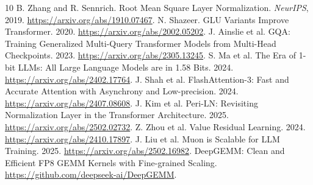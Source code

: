 \documentclass[11pt]{article}
\begin{document}
\begin{thebibliography}{10}
 B. Zhang and R. Sennrich. Root Mean Square Layer Normalization. \emph{NeurIPS}, 2019. \url{https://arxiv.org/abs/1910.07467}.
 N. Shazeer. GLU Variants Improve Transformer. 2020. \url{https://arxiv.org/abs/2002.05202}.
 J. Ainslie et al. GQA: Training Generalized Multi-Query Transformer Models from Multi-Head Checkpoints. 2023. \url{https://arxiv.org/abs/2305.13245}.
 S. Ma et al. The Era of 1-bit LLMs: All Large Language Models are in 1.58 Bits. 2024. \url{https://arxiv.org/abs/2402.17764}.
 J. Shah et al. FlashAttention-3: Fast and Accurate Attention with Asynchrony and Low-precision. 2024. \url{https://arxiv.org/abs/2407.08608}.
 J. Kim et al. Peri-LN: Revisiting Normalization Layer in the Transformer Architecture. 2025. \url{https://arxiv.org/abs/2502.02732}.
 Z. Zhou et al. Value Residual Learning. 2024. \url{https://arxiv.org/abs/2410.17897}.
 J. Liu et al. Muon is Scalable for LLM Training. 2025. \url{https://arxiv.org/abs/2502.16982}.
 DeepGEMM: Clean and Efficient FP8 GEMM Kernels with Fine-grained Scaling. \url{https://github.com/deepseek-ai/DeepGEMM}.
\end{thebibliography}
\end{document}
